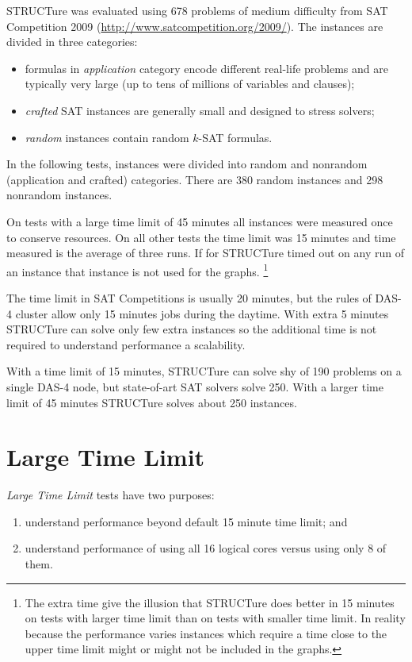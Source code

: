 STRUCTure was evaluated using 678 problems
of medium difficulty from SAT Competition 2009
(\url{http://www.satcompetition.org/2009/}). The instances are
divided in three categories:
\begin{itemize}
  \item formulas in \emph{application} category encode different
  real-life problems and are typically very large (up to tens of
  millions of variables and clauses);
  \item \emph{crafted} SAT instances are generally small and designed
  to stress solvers;
  \item \emph{random} instances contain random $k$-SAT formulas.
\end{itemize}

In the following tests, instances were divided into random and
nonrandom (application and crafted) categories. There are 380 random
instances and 298 nonrandom instances.

On tests with a large time limit of 45 minutes all instances were
measured once to conserve resources. On all other tests the time
limit was 15 minutes and time measured is the average of three runs.
If for STRUCTure timed out on any run of an instance that instance
is not used for the graphs.  \footnote{The extra time give
the illusion that STRUCTure does better in 15 minutes on tests
with larger time limit than on tests with smaller time limit.
In reality because the performance varies instances which require
a time close to the upper time limit might or might not be included
in the graphs.}

The time limit in SAT Competitions is usually 20 minutes, but
the rules of DAS-4 cluster allow only 15 minutes jobs during the
daytime.  With extra 5 minutes STRUCTure can solve only few extra
instances so the additional time is not required to understand
performance a scalability.

With a time limit of 15 minutes, STRUCTure can solve shy of 190
problems on a single DAS-4 node, but state-of-art SAT solvers solve
250. With a larger time limit of 45 minutes STRUCTure solves about
250 instances.


\section{Large Time Limit}

\emph{Large Time Limit} tests have two purposes:
\begin{enumerate}
  \item understand performance beyond default 15 minute time limit; and
  \item understand performance of using all 16 logical cores versus
  using only 8 of them.
\end{enumerate}

